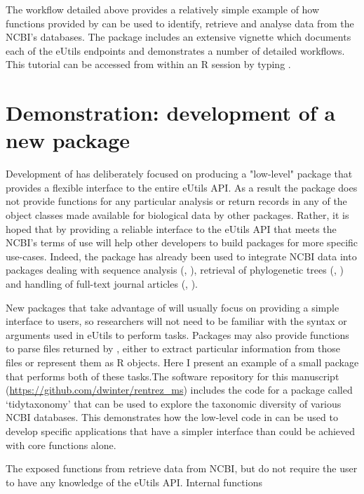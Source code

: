 The workflow detailed above provides a relatively simple example of how functions
provided by  can be used to identify, retrieve and analyse data
from the NCBI's databases. The package includes an extensive vignette which
documents each of the eUtils endpoints and demonstrates a number of detailed
workflows. This tutorial can be accessed from within an R session by typing 
.

\section{Demonstration: development of a new package}

Development of  has deliberately focused on producing a "low-level"
package that provides a flexible interface to the entire eUtils API. As a 
result the package does not provide functions for any particular analysis
or return records in any of the object classes made available for biological
data by other packages. Rather, it is hoped that by providing a reliable interface
to the eUtils API that meets the NCBI's terms of use  will help 
other developers to build packages for more specific use-cases. Indeed, the
package has already been used to integrate NCBI data into packages dealing
with sequence analysis (, \citealt{genbankr}), retrieval of
phylogenetic trees (, \citealt{rotl}) and handling of
full-text journal articles (, \citealt{fulltext}).

New packages that take advantage of  will usually focus on
providing a simple interface to users, so researchers will not need to be
familiar with the syntax or arguments used in eUtils to perform tasks. Packages may
also provide functions to parse files returned by , either
to extract particular information from those files or represent them as R 
objects. Here I present an example of a small package that performs both of
these tasks.The software repository for this manuscript
(\url{https://github.com/dwinter/rentrez_ms}) includes the code for a package 
called `tidytaxonomy' that can be used to explore the taxonomic
diversity of various NCBI databases. This demonstrates how the 
low-level code in  can be used to develop specific applications 
that have a simpler interface than could be achieved with core 
 functions alone.

The exposed functions from  retrieve data from NCBI, but do not
require the user to have any knowledge of the eUtils API. Internal functions

